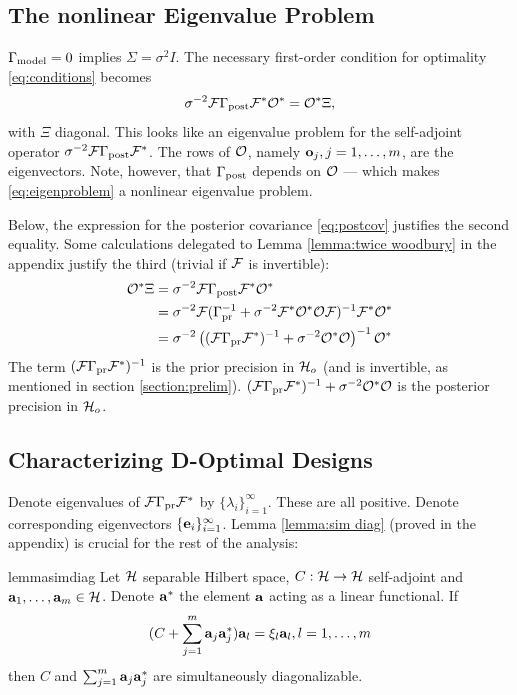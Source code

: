 \documentclass{amsart}
\numberwithin{equation}{section}
\begin{document}
\subsection{The nonlinear Eigenvalue Problem}\label{subsec:eigenproblem}
$\Gamma_{\textup{model}} = 0$ implies $\Sigma= \sigma^2I$. The necessary first-order
condition for optimality \eqref{eq:conditions} becomes
\begin{equation}\label{eq:eigenproblem}
  \sigma^{-2}\mathcal{F} \Gamma_{\textup{post}} \mathcal{F}^* \mathcal{O}^* = \mathcal{O}^* \Xi, 
\end{equation}
with $\Xi$ diagonal. This looks like an eigenvalue problem for the
self-adjoint operator $\sigma^{-2}\mathcal{F} \Gamma_{\textup{post}} \mathcal{F}^*$. The rows of
$\mathcal{O}$, namely $\mathbf{o}_j,j=1,\dots, m$, are the eigenvectors. Note,
however, that $\Gamma_{\textup{post}}$ depends on $\mathcal{O}$ --- which makes
\eqref{eq:eigenproblem} a nonlinear eigenvalue problem.

Below, the expression for the posterior covariance \eqref{eq:postcov}
justifies the second equality. Some calculations delegated to Lemma
\ref{lemma:twice woodbury} in the appendix justify the third (trivial
if $\mathcal{F}$ is invertible):
\begin{align}\label{eq:mod conditions}
  \begin{split}
  \mathcal{O}^* \Xi &= \sigma^{-2}\mathcal{F} \Gamma_{\textup{post}} \mathcal{F}^* \mathcal{O}^*  \\
  &= \sigma^{-2} \mathcal{F}( \Gamma_{\textup{pr}}^{-1} + \sigma^{-2}  \mathcal{F}^* \mathcal{O}^* \mathcal{O} \mathcal{F} )^{-1} \mathcal{F}^* \mathcal{O}^* \\
  &= \sigma^{-2} \left ( (\mathcal{F}\Gamma_{\textup{pr}}\mathcal{F}^*)^{-1} + \sigma^{-2}  \mathcal{O}^* \mathcal{O} \right )^{-1} \mathcal{O}^*
  \end{split}
\end{align}  
The term $(\mathcal{F} \Gamma_{\textup{pr}} \mathcal{F}^*)^{-1}$ is the prior precision in $\mathcal{H}_o$
(and is invertible, as mentioned in section
\ref{section:prelim}). $(\mathcal{F}\Gamma_{\textup{pr}}\mathcal{F}^*)^{-1} + \sigma^{-2} \mathcal{O}^*
\mathcal{O}$ is the posterior precision in $\mathcal{H}_o$.

\subsection{Characterizing D-Optimal Designs}\label{subsec:characterization}
Denote eigenvalues of $\mathcal{F} \Gamma_{\textup{pr}} \mathcal{F}^*$ by
$\{\lambda_i\}_{i=1}^{\infty}$. These are all positive. Denote
corresponding eigenvectors $\{\mathbf{e}_i\}_{i=1}^{\infty}$. Lemma
\ref{lemma:sim diag} (proved in the appendix) is crucial for the rest
of the analysis:

\begin{restatable*}{lemma}{simdiag}\label{lemma:sim diag}
  Let $\mathcal{H}$ separable Hilbert space, $C:\mathcal{H} \to \mathcal{H}$ self-adjoint
  and $\mathbf{a}_1,\dots,\mathbf{a}_m \in \mathcal{H}$. Denote $\mathbf{a}^*$ the element
  $\mathbf{a}$ acting as a linear functional. If
  \begin{equation*}
   (C + \sum_{j=1}^m \mathbf{a}_j\mathbf{a}_j^*) \mathbf{a}_l = \xi_l \mathbf{a}_l, l = 1,\dots,m
  \end{equation*}
  then $C$ and $\sum_{j=1}^m \mathbf{a}_j \mathbf{a}_j^*$ are simultaneously
  diagonalizable.
\end{restatable*}
\end{document}
